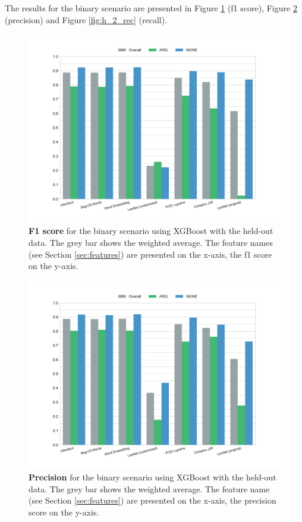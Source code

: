 \FloatBarrier


The results for the binary scenario are presented in Figure \ref{fig:h_2_f1} (f1 score), Figure \ref{fig:h_2_prec} (precision) and Figure \ref{fig:h_2_rec} (recall).

\begin{figure}[htbp]
         \caption{\textbf{F1 score} for the binary scenario using XGBoost with the held-out data. The grey bar shows the weighted average. The feature names (see Section \ref{sec:features}) are presented on the x-axis, the f1 score on the y-axis.} 
    \label{fig:h_2_f1}
    \centering
	\includegraphics[width=0.9\linewidth]{images/heldout/h-f1-True}
    \end{figure}


\begin{figure}[htbp]
         \caption{\textbf{Precision} for the binary scenario using XGBoost with the held-out data. The grey bar shows the weighted average. The feature name (see Section \ref{sec:features}) are presented on the x-axis, the precision score on the y-axis.} 
    \label{fig:h_2_prec}
    \centering
	\includegraphics[width=0.9\linewidth]{images/heldout/h-precision-True}
    \end{figure}
    
